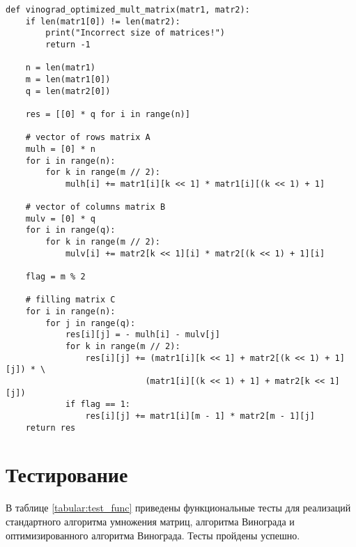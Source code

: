 \captionsetup{singlelinecheck = false, justification=raggedright}
\begin{lstlisting}[caption=Реализация оптимизированного алгоритма Винограда умножения матриц,
	label={vinograd_opt_mult}]
def vinograd_optimized_mult_matrix(matr1, matr2):
    if len(matr1[0]) != len(matr2):
        print("Incorrect size of matrices!")
        return -1

    n = len(matr1)
    m = len(matr1[0])
    q = len(matr2[0])

    res = [[0] * q for i in range(n)]

    # vector of rows matrix A
    mulh = [0] * n
    for i in range(n):
        for k in range(m // 2):
            mulh[i] += matr1[i][k << 1] * matr1[i][(k << 1) + 1]

    # vector of columns matrix B
    mulv = [0] * q
    for i in range(q):
        for k in range(m // 2):
            mulv[i] += matr2[k << 1][i] * matr2[(k << 1) + 1][i]

    flag = m % 2
    
    # filling matrix C
    for i in range(n):
        for j in range(q):
            res[i][j] = - mulh[i] - mulv[j]
            for k in range(m // 2):
                res[i][j] += (matr1[i][k << 1] + matr2[(k << 1) + 1][j]) * \
                            (matr1[i][(k << 1) + 1] + matr2[k << 1][j])
            if flag == 1:
                res[i][j] += matr1[i][m - 1] * matr2[m - 1][j]
    return res

\end{lstlisting}
\captionsetup{singlelinecheck = false, justification=centering}

\section{Тестирование}

В таблице \ref{tabular:test_func} приведены функциональные тесты для реализаций стандартного алгоритма умножения матриц, алгоритма Винограда и оптимизированного алгоритма Винограда. Тесты пройдены успешно.

